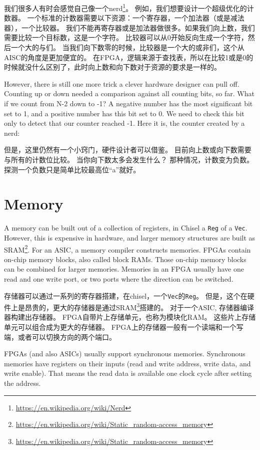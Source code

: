 \documentclass[%
    10pt,
    headinclude, footexclude,
    openright, %
    notitlepage,
    cleardoubleempty,
    headsepline,
    pointlessnumbers,
    bibtotoc, idxtotoc,
    ]{scrbook}
\newcommand{\code}[1]{{\small{\texttt{#1}}}}
\newcommand{\myref}[2]{\href{#1}{#2}}
\renewcommand{\myref}[2]{{#2}{\footnote{\url{#1}}}}
\begin{document}
我们很多人有时会感觉自己像一个\myref{https://en.wikipedia.org/wiki/Nerd}{nerd}。
例如，我们想要设计一个超级优化的计数器。
一个标准的计数器需要以下资源：一个寄存器，一个加法器（或是减法器），一个比较器。
我们不能再寄存器或是加法器做很多。如果我们向上数，我们需要比较一个目标数，这是一个字符。
比较器可以从0开始反向生成一个字符，然后一个大的与们。
当我们向下数零的时候，比较器是一个大的或非们，这个从AISC的角度是更加便宜的。
在FPGA，逻辑来源于查找表，所以在比较1或是0的时候就没什么区别了，此时向上数和向下数对于资源的要求是一样的。


However, there is still one more trick a clever hardware designer can pull off.
Counting up or down needed a comparison against all counting bits, so far.
What if we count from N-2 down to -1? A negative number has the most significant bit
set to 1, and a positive number has this bit set to 0. We need to check this bit only to detect
that our counter reached -1. Here it is, the counter created by a nerd:

但是，这里仍然有一个小窍门，硬件设计者可以借鉴。
目前向上数或向下数需要与所有的计数位比较。
当你向下数太多会发生什么？
那种情况，计数变为负数。探测一个负数只是简单比较最高位“a”就好。


\section{Memory}

A memory can be built out of a collection of registers, in Chisel a \code{Reg} of a \code{Vec}.
However, this is expensive in hardware, and larger memory structures are built
as \myref{https://en.wikipedia.org/wiki/Static_random-access_memory}{SRAM}.
For an ASIC, a memory compiler constructs memories.
FPGAs contain on-chip memory blocks, also called block RAMs.
Those on-chip memory blocks can be combined for larger memories.
Memories in an FPGA usually have one read and one write port, or
two ports where the direction can be switched.

存储器可以通过一系列的寄存器搭建，在chisel，一个\code{Vec}的\code{Reg}。
但是，这个在硬件上是昂贵的，更大的存储器是通过\myref{https://en.wikipedia.org/wiki/Static_random-access_memory}{SRAM}搭建的。
对于一个ASIC, 存储器编译器构建出存储器。
FPGA自带片上存储单元，也称为模块化RAM。
这些片上存储单元可以组合成为更大的存储器。
FPGA上的存储器一般有一个读端和一个写端，或者可以切换方向的两个端口。

FPGAs (and also ASICs) usually support synchronous memories.
Synchronous memories have registers on their inputs (read and write address, write data,
and write enable). That means the read data is available one clock
cycle after setting the address.
\end{document}
